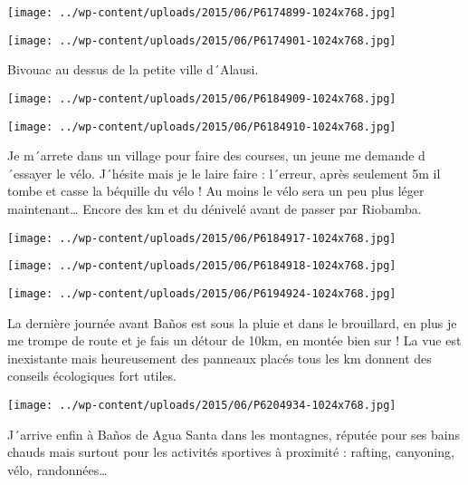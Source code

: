 \centerline{\texttt{[image: ../wp-content/uploads/2015/06/P6174899-1024x768.jpg]} } 
 \newline
 \newline
\centerline{\texttt{[image: ../wp-content/uploads/2015/06/P6174901-1024x768.jpg]} } 
 \newline
 Bivouac au dessus de la petite ville d´Alausi. \newline
 \newline
\centerline{\texttt{[image: ../wp-content/uploads/2015/06/P6184909-1024x768.jpg]} } 
 \newline
 \newline
\centerline{\texttt{[image: ../wp-content/uploads/2015/06/P6184910-1024x768.jpg]} } 
 \newline
 Je m´arrete dans un village pour faire des courses, un jeune me demande d´essayer le vélo. J´hésite mais je le laire faire : l´erreur, après seulement 5m il tombe et casse la béquille du vélo ! Au moins le vélo sera un peu plus léger maintenant… \newline
 Encore des km et du dénivelé avant de passer par Riobamba. \newline
 \newline
\centerline{\texttt{[image: ../wp-content/uploads/2015/06/P6184917-1024x768.jpg]} } 
 \newline
 \newline
\centerline{\texttt{[image: ../wp-content/uploads/2015/06/P6184918-1024x768.jpg]} } 
 \newline
 \newline
\centerline{\texttt{[image: ../wp-content/uploads/2015/06/P6194924-1024x768.jpg]} } 
 \newline
 La dernière journée avant Baños est sous la pluie et dans le brouillard, en plus je me trompe de route et je fais un détour de 10km, en montée bien sur ! \newline
 La vue est inexistante mais heureusement des panneaux placés tous les km donnent des conseils écologiques fort utiles. \newline
 \newline
\centerline{\texttt{[image: ../wp-content/uploads/2015/06/P6204934-1024x768.jpg]} } 
 \newline
 J´arrive enfin à Baños de Agua Santa dans les montagnes, réputée pour ses bains chauds mais surtout pour les activités sportives à proximité : rafting, canyoning, vélo, randonnées… \newline
